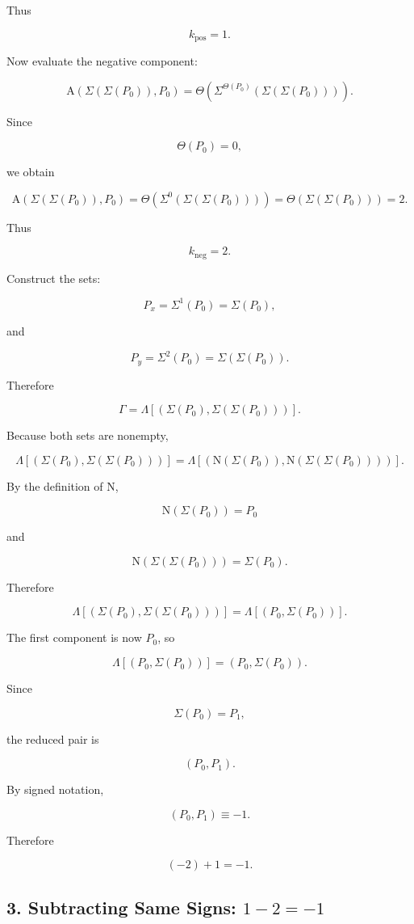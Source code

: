 \documentclass[12pt]{article}
\newcommand{\Alpha}{\mathrm{A}}
\newcommand{\Nu}{\mathrm{N}}
\begin{document}
Thus

\[
k_{\mathrm{pos}}=1.
\]

Now evaluate the negative component:

\[
\Alpha(\Sigma(\Sigma(P_0)),P_0)
=
\Theta\left(
\Sigma^{\Theta(P_0)}(\Sigma(\Sigma(P_0)))
\right).
\]

Since

\[
\Theta(P_0)=0,
\]

we obtain

\[
\Alpha(\Sigma(\Sigma(P_0)),P_0)
=
\Theta(\Sigma^0(\Sigma(\Sigma(P_0))))
=
\Theta(\Sigma(\Sigma(P_0)))
=
2.
\]

Thus

\[
k_{\mathrm{neg}}=2.
\]

Construct the sets:

\[
P_x
=
\Sigma^1(P_0)
=
\Sigma(P_0),
\]

and

\[
P_y
=
\Sigma^2(P_0)
=
\Sigma(\Sigma(P_0)).
\]

Therefore

\[
\Gamma
=
\Lambda[(\Sigma(P_0),\Sigma(\Sigma(P_0)))].
\]

Because both sets are nonempty,

\[
\Lambda[(\Sigma(P_0),\Sigma(\Sigma(P_0)))]
=
\Lambda[(\Nu(\Sigma(P_0)),\Nu(\Sigma(\Sigma(P_0))))].
\]

By the definition of \(\Nu\),

\[
\Nu(\Sigma(P_0))=P_0
\]

and

\[
\Nu(\Sigma(\Sigma(P_0)))=\Sigma(P_0).
\]

Therefore

\[
\Lambda[(\Sigma(P_0),\Sigma(\Sigma(P_0)))]
=
\Lambda[(P_0,\Sigma(P_0))].
\]

The first component is now \(P_0\), so

\[
\Lambda[(P_0,\Sigma(P_0))]
=
(P_0,\Sigma(P_0)).
\]

Since

\[
\Sigma(P_0)=P_1,
\]

the reduced pair is

\[
(P_0,P_1).
\]

By signed notation,

\[
(P_0,P_1)\equiv-1.
\]

Therefore

\[
\boxed{
(-2)+1=-1.
}
\]

\subsection*{3. Subtracting Same Signs: \(1-2=-1\)}
\end{document}
